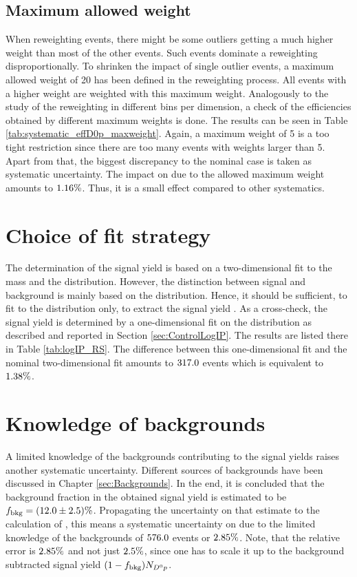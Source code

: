 \subsection{Maximum allowed weight}
When reweighting events, there might be some outliers getting a much higher weight than most of the other events.
Such events dominate a reweighting disproportionally.
To shrinken the impact of single outlier events, a maximum allowed weight of 20 has been defined in the reweighting process.
All events with a higher weight are weighted with this maximum weight.
Analogously to the study of the reweighting in different bins per dimension, a check of the efficiencies obtained by different maximum weights is done.
The results can be seen in Table \ref{tab:systematic_effD0p_maxweight}.
Again, a maximum weight of 5 is a too tight restriction since there are too many events with weights larger than 5.
Apart from that, the biggest discrepancy to the nominal case is taken as systematic uncertainty.
The impact on \R due to the allowed maximum weight amounts to $1.16\%$.
Thus, it is a small effect compared to other systematics.


\section{Choice of fit strategy}
The determination of the \LbToDpmunuX signal yield is based on a two-dimensional fit to the \Dz\proton mass and the \logIP distribution.
However, the distinction between signal and background is mainly based on the \logIP distribution.
Hence, it should be sufficient, to fit to the \logIP distribution only, to extract the signal yield \NDp.
As a cross-check, the signal yield \NDp is determined by a one-dimensional fit on the \logIP distribution as described and reported in Section \ref{sec:ControlLogIP}.
The results are listed there in Table \ref{tab:logIP_RS}.
The difference between this one-dimensional fit and the nominal two-dimensional fit amounts to $317.0$ events which is equivalent to $1.38\%$.

\section{Knowledge of backgrounds}
A limited knowledge of the backgrounds contributing to the signal yields raises another systematic uncertainty.
Different sources of backgrounds have been discussed in Chapter \ref{sec:Backgrounds}.
In the end, it is concluded that the background fraction in the obtained signal yield \NDp is estimated to be $f_\text{bkg} = (12.0 \pm 2.5)\%$.
Propagating the uncertainty on that estimate to the calculation of \R, this means a systematic uncertainty on \NDp due to the limited knowledge of the backgrounds of $576.0$ events or $2.85\%$.
Note, that the relative error is $2.85\%$ and not just $2.5\%$, since one has to scale it up to the background subtracted signal yield $(1-f_\text{bkg})N_{{{D}^0}{p}}$.

